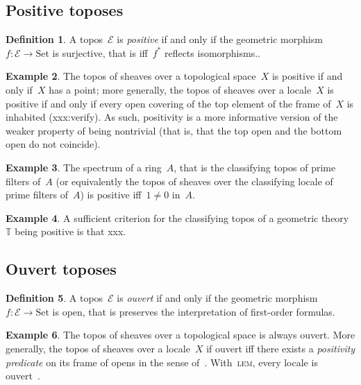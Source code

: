 \documentclass[oneside,reqno]{amsart}
\theoremstyle{definition}
\newtheorem{defn}{Definition}[section]
\newtheorem{ex}[defn]{Example}
\theoremstyle{plain}
\theoremstyle{remark}
\newcommand{\E}{\mathcal{E}}
\newcommand{\TT}{\mathbb{T}}
\newcommand{\Set}{\mathrm{Set}}
\renewcommand{\_}{\mathpunct{.}\,}
\newcommand{\?}{\,{:}\,}
\begin{document}
\subsection{Positive toposes}

\begin{defn}A topos~$\E$ is \emph{positive} if and only if the geometric
morphism~$f : \E \to \Set$ is surjective, that is iff~$f^*$ reflects
isomorphisms..\end{defn}

\begin{ex}The topos of sheaves over a topological space~$X$ is positive if and
only if~$X$ has a point; more generally, the topos of sheaves over a locale~$X$
is positive if and only if every open covering of the top element of the frame
of~$X$ is inhabited (xxx:verify). As such, positivity is a more informative
version of the weaker property of being nontrivial (that is, that the top open
and the bottom open do not coincide).\end{ex}

\begin{ex}The spectrum of a ring~$A$, that is the classifying topos of prime
filters of~$A$ (or equivalently the topos of sheaves over the classifying
locale of prime filters of~$A$) is positive iff~$1 \neq 0$ in~$A$.\end{ex}

\begin{ex}A sufficient criterion for the classifying topos of a geometric
theory~$\TT$ being positive is that xxx.\end{ex}


\subsection{Ouvert toposes}

\begin{defn}A topos~$\E$ is \emph{ouvert} if and only if the geometric
morphism~$f : \E \to \Set$ is open, that is preserves the interpretation of
first-order formulas.\end{defn}

\begin{ex}The topos of sheaves over a topological space is always ouvert. More
generally, the topos of sheaves over a locale~$X$ if ouvert iff there exists a
\emph{positivity predicate} on its frame of opens in the sense of~\cite{xxx}.
With~\textsc{lem}, every locale is ouvert~\cite{xxx}.\end{ex}
\end{document}

